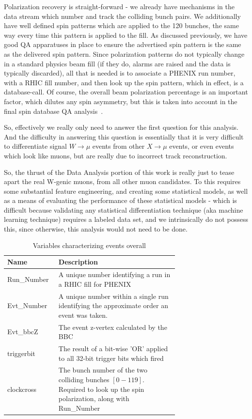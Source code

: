 Polarization recovery is straight-forward - we already have mechanisms in the
data stream which number and track the colliding bunch pairs. We additionally
have well defined spin patterns which are applied to the 120 bunches, the same
way every time this pattern is applied to the fill. As discussed previously, we
have good QA apparatuses in place to ensure the advertised spin pattern is the
same as the delivered spin pattern. Since polarization patterns do not typically
change in a standard physics beam fill (if they do, alarms are raised and the
data is typically discarded), all that is needed is to associate a PHENIX run
number, with a RHIC fill number, and then look up the spin pattern, which in
effect, is a database-call. Of course, the overall beam polarization percentage
is an important factor, which dilutes any spin asymmetry, but this is taken into
account in the final spin database QA analysis~\cite{Kim2014}.

So, effectively we really only need to answer the first question for this
analysis. And the difficulty in answering this question is essentially that it
is very difficult to differentiate signal $W\rightarrow\mu$ events from other
$X\rightarrow\mu$ events, or even events which look like muons, but are really
due to incorrect track reconstruction.

So, the thrust of the Data Analysis portion of this work is really just to tease
apart the real W-genic muons, from all other muon candidates. To this requires
some substantial feature engineering, and creating some statistical models, as
well as a means of evaluating the performance of these statistical models -
which is difficult because validating any statistical differentiation technique
(aka machine learning technique) requires a labeled data set, and we
intrinsically do not possess this, since otherwise, this analysis would not need
to be done.

\begin{table}
  \centering
  \begin{tabular}{l p{0.7\linewidth}}
    \toprule
      \textbf{Name} & \textbf{Description} \\
    \midrule
      Run\_Number & A unique number identifying a run in a RHIC fill for PHENIX \\
      Evt\_Number & A unique number within a single run identifying the approximate order an event was taken. \\
      Evt\_bbcZ & The event z-vertex calculated by the BBC \\
      triggerbit & The result of a bit-wise 'OR' applied to all 32-bit trigger bits which fired \\
    clockcross & The bunch number of the two colliding bunches $[0-119]$. Required to look up the spin polarization, along with Run\_Number \\
    \bottomrule
  \end{tabular}
  \caption{Variables characterizing events overall}
  \label{tab:evt_variables}
\end{table}

